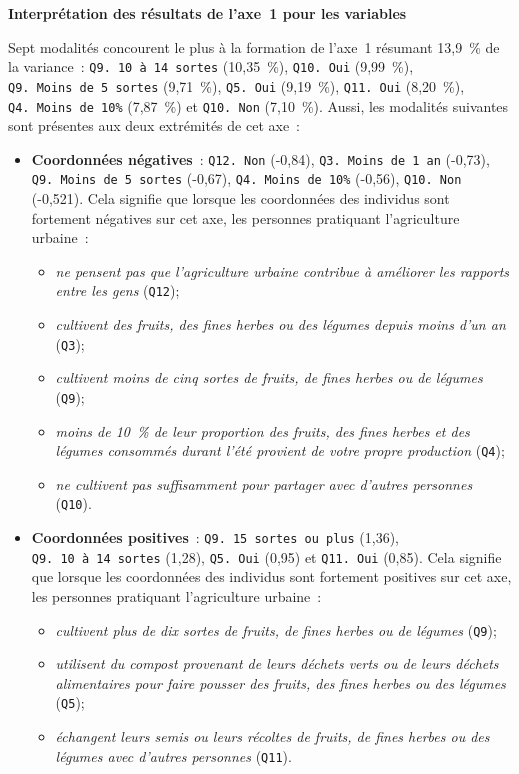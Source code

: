 \documentclass[
  11pt,
  french,
]{book}
\providecommand{\tightlist}{%
  \setlength{\itemsep}{0pt}\setlength{\parskip}{0pt}}
\begin{document}
\textbf{Interprétation des résultats de l'axe~1 pour les variables}

Sept modalités concourent le plus à la formation de l'axe~1 résumant 13,9~\% de la variance~: \texttt{Q9.\ 10\ à\ 14\ sortes} (10,35~\%), \texttt{Q10.\ Oui} (9,99~\%), \texttt{Q9.\ Moins\ de\ 5\ sortes} (9,71~\%), \texttt{Q5.\ Oui} (9,19~\%), \texttt{Q11.\ Oui} (8,20~\%), \texttt{Q4.\ Moins\ de\ 10\%} (7,87~\%) et \texttt{Q10.\ Non} (7,10~\%). Aussi, les modalités suivantes sont présentes aux deux extrémités de cet axe~:

\begin{itemize}
\tightlist
\item
  \textbf{Coordonnées négatives}~: \texttt{Q12.\ Non} (-0,84), \texttt{Q3.\ Moins\ de\ 1\ an} (-0,73), \texttt{Q9.\ Moins\ de\ 5\ sortes} (-0,67), \texttt{Q4.\ Moins\ de\ 10\%} (-0,56), \texttt{Q10.\ Non} (-0,521). Cela signifie que lorsque les coordonnées des individus sont fortement négatives sur cet axe, les personnes pratiquant l'agriculture urbaine~:

  \begin{itemize}
  \tightlist
  \item
    \emph{ne pensent pas que l'agriculture urbaine contribue à améliorer les rapports entre les gens} (\texttt{Q12});
  \item
    \emph{cultivent des fruits, des fines herbes ou des légumes depuis moins d'un an} (\texttt{Q3});
  \item
    \emph{cultivent moins de cinq sortes de fruits, de fines herbes ou de légumes} (\texttt{Q9});
  \item
    \emph{moins de 10~\% de leur proportion des fruits, des fines herbes et des légumes consommés durant l'été provient de votre propre production }(\texttt{Q4});
  \item
    \emph{ne cultivent pas suffisamment pour partager avec d'autres personnes} (\texttt{Q10}).
  \end{itemize}
\item
  \textbf{Coordonnées positives}~: \texttt{Q9.\ 15\ sortes\ ou\ plus} (1,36), \texttt{Q9.\ 10\ à\ 14\ sortes} (1,28), \texttt{Q5.\ Oui} (0,95) et \texttt{Q11.\ Oui} (0,85). Cela signifie que lorsque les coordonnées des individus sont fortement positives sur cet axe, les personnes pratiquant l'agriculture urbaine~:

  \begin{itemize}
  \tightlist
  \item
    \emph{cultivent plus de dix sortes de fruits, de fines herbes ou de légumes} (\texttt{Q9});
  \item
    \emph{utilisent du compost provenant de leurs déchets verts ou de leurs déchets alimentaires pour faire pousser des fruits, des fines herbes ou des légumes} (\texttt{Q5});
  \item
    \emph{échangent leurs semis ou leurs récoltes de fruits, de fines herbes ou des légumes avec d'autres personnes} (\texttt{Q11}).
  \end{itemize}
\end{itemize}
\end{document}
